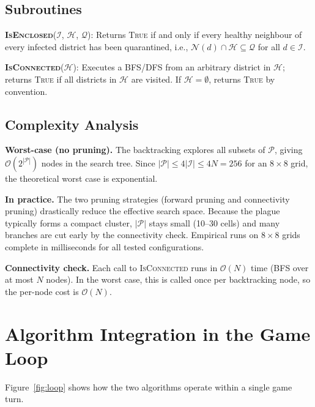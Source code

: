 \documentclass[conference]{IEEEtran}
\begin{document}
\subsection{Subroutines}

\textbf{\textsc{IsEnclosed}}($\mathcal{I}$, $\mathcal{H}$, $\mathcal{Q}$): Returns
\textsc{True} if and only if every healthy neighbour of every infected district has
been quarantined, i.e., $\mathcal{N}(d) \cap \mathcal{H} \subseteq \mathcal{Q}$
for all $d \in \mathcal{I}$.

\textbf{\textsc{IsConnected}}($\mathcal{H}$): Executes a BFS/DFS from an arbitrary
district in $\mathcal{H}$; returns \textsc{True} if all districts in $\mathcal{H}$
are visited. If $\mathcal{H} = \emptyset$, returns \textsc{True} by convention.

\subsection{Complexity Analysis}

\textbf{Worst-case (no pruning).} The backtracking explores all subsets of
$\mathcal{P}$, giving $\mathcal{O}(2^{|\mathcal{P}|})$ nodes in the search tree.
Since $|\mathcal{P}| \le 4|\mathcal{I}| \le 4N = 256$ for an $8\times8$ grid, the
theoretical worst case is exponential.

\textbf{In practice.} The two pruning strategies (forward pruning and connectivity
pruning) drastically reduce the effective search space. Because the plague typically
forms a compact cluster, $|\mathcal{P}|$ stays small (10–30 cells) and many branches
are cut early by the connectivity check. Empirical runs on $8\times8$ grids complete
in milliseconds for all tested configurations.

\textbf{Connectivity check.} Each call to \textsc{IsConnected} runs in
$\mathcal{O}(N)$ time (BFS over at most $N$ nodes). In the worst case, this is
called once per backtracking node, so the per-node cost is $\mathcal{O}(N)$.

\section{Algorithm Integration in the Game Loop}
\label{sec:integration}

Figure~\ref{fig:loop} shows how the two algorithms operate within a single game turn.
\end{document}
